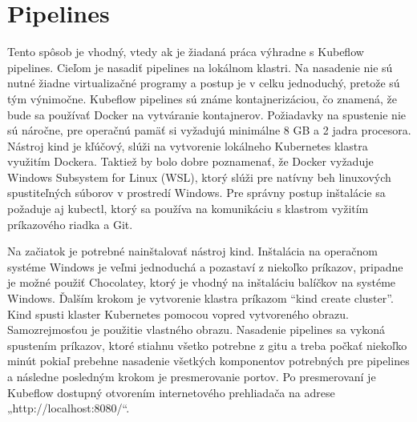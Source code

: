 \section{Pipelines}

Tento spôsob je vhodný, vtedy ak je žiadaná práca výhradne s Kubeflow pipelines. Cieľom je nasadiť pipelines na lokálnom klastri. Na nasadenie nie sú nutné žiadne virtualizačné programy a postup je v celku jednoduchý, pretože sú tým výnimočne. Kubeflow pipelines sú známe kontajnerizáciou, čo znamená, že bude sa používať Docker na vytváranie kontajnerov. Požiadavky na spustenie nie sú náročne, pre operačnú pamäť si vyžadujú minimálne 8 GB a 2 jadra procesora. Nástroj kind je kľúčový, slúži na vytvorenie lokálneho Kubernetes klastra využitím Dockera. Taktiež by bolo dobre poznamenať, že Docker vyžaduje Windows Subsystem for Linux (WSL), ktorý slúži pre natívny beh linuxových spustiteľných súborov v prostredí Windows. Pre správny postup inštalácie sa požaduje aj kubectl, ktorý sa používa na komunikáciu s klastrom vyžitím príkazového riadka a Git.

Na začiatok je potrebné nainštalovať nástroj kind. Inštalácia na operačnom systéme Windows je veľmi jednoduchá a pozastaví z niekoľko príkazov, pripadne je možné použiť Chocolatey, ktorý je vhodný na inštaláciu balíčkov na systéme Windows. Ďalším krokom je vytvorenie klastra príkazom “kind create cluster”.  Kind spusti klaster Kubernetes pomocou vopred vytvoreného obrazu. Samozrejmosťou je použitie vlastného obrazu. Nasadenie pipelines sa vykoná spustením príkazov, ktoré stiahnu všetko potrebne z gitu a treba počkať niekoľko minút pokiaľ prebehne nasadenie všetkých komponentov potrebných pre pipelines a následne posledným krokom je presmerovanie portov. Po presmerovaní je Kubeflow dostupný otvorením internetového prehliadača na adrese „http://localhost:8080/“.


\clearpage